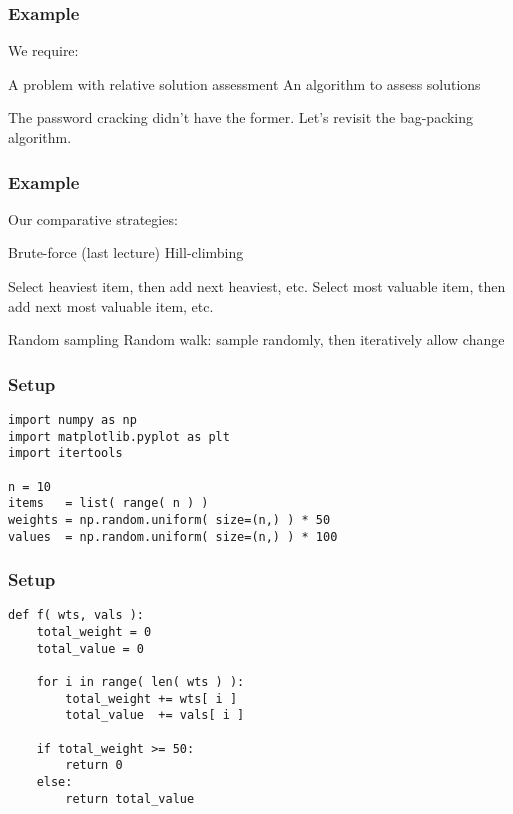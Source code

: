 \documentclass[11pt]{beamer}
\begin{document}
\begin{frame}[fragile]
  \frametitle{Example}
  \Enlarge

  \begin{enumerate}
  \myitem  We require:
    \begin{enumerate}
    \mysubitem  A problem with relative solution assessment
    \mysubitem  An algorithm to assess solutions
    \end{enumerate}
  \myitem  The password cracking didn't have the former.
  \myitem  Let's revisit the bag-packing algorithm.
  \end{enumerate}
\end{frame}

\begin{frame}[fragile]
  \frametitle{Example}
  \Enlarge

  \begin{enumerate}
  \myitem  Our comparative strategies:
    \begin{enumerate}
    \mysubitem  Brute-force (last lecture)
    \mysubitem  Hill-climbing \pause
      \begin{enumerate}
      \mysubitem  Select heaviest item, then add next heaviest, etc. \pause
      \mysubitem  Select most valuable item, then add next most valuable item, etc. \pause
      \end{enumerate}
    \mysubitem  Random sampling \pause
    \mysubitem  Random walk:  sample randomly, then iteratively allow change
    \end{enumerate}
  \end{enumerate}
\end{frame}

\begin{frame}[fragile]
  \frametitle{Setup}
  \Enlarge

  \begin{Verbatim}
import numpy as np
import matplotlib.pyplot as plt
import itertools

n = 10
items   = list( range( n ) )
weights = np.random.uniform( size=(n,) ) * 50
values  = np.random.uniform( size=(n,) ) * 100
  \end{Verbatim}
\end{frame}

\begin{frame}[fragile]
  \frametitle{Setup}

  \begin{Verbatim}
def f( wts, vals ):
    total_weight = 0
    total_value = 0

    for i in range( len( wts ) ):
        total_weight += wts[ i ]
        total_value  += vals[ i ]

    if total_weight >= 50:
        return 0
    else:
        return total_value
  \end{Verbatim}
\end{frame}
\end{document}
